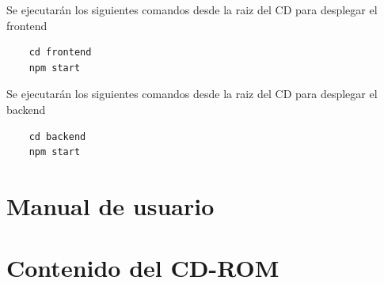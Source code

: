 \documentclass[openright,twoside,10pt]{book}
\begin{document}
    Se ejecutarán los siguientes comandos desde la raiz del CD para
    desplegar el frontend
    
    \begin{verbatim}
    cd frontend
    npm start
    \end{verbatim}
    
    Se ejecutarán los siguientes comandos desde la raiz del CD para
    desplegar el backend
    
    \begin{verbatim}
    cd backend
    npm start
    \end{verbatim}
    
    \chapter{Manual de usuario}\label{manual-de-usuario}
    
    \chapter{Contenido del CD-ROM}\label{contenido-del-cd-rom}
    
    
    \nocite{*} \printbibliography

    \cleardoublepage

\end{document}
